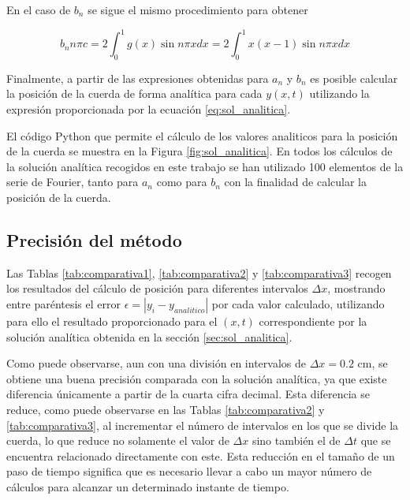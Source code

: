 \documentclass[11pt]{article}
\begin{document}
En el caso de $b_n$ se sigue el mismo procedimiento para obtener

\begin{equation}
	b_n n\pi{c} = 2 \int_0^1 g(x) \sin{n\pi{x}}dx = 2 \int_0^1 x(x-1) \sin{n\pi{x}}dx 
\end{equation}

Finalmente, a partir de las expresiones obtenidas para $a_n$ y $b_n$ es posible calcular
la posición de la cuerda de forma analítica para cada $y(x,t)$ utilizando la expresión
proporcionada por la ecuación \eqref{eq:sol_analitica}.

El código Python que permite el cálculo de los valores analiticos para la posición de la
cuerda se muestra en la Figura \ref{fig:sol_analitica}. En todos los cálculos de la solución
analítica recogidos en este trabajo se han utilizado 100 elementos de la serie de Fourier,
tanto para $a_n$ como para $b_n$ con la finalidad de calcular la posición de la cuerda.

\subsection{Precisión del método}

Las Tablas \ref{tab:comparativa1}, \ref{tab:comparativa2} y \ref{tab:comparativa3} recogen
los resultados del cálculo de posición para diferentes intervalos $\Delta{x}$, mostrando
entre paréntesis el error $\epsilon = |y_i - y_{analitico}|$ por cada valor calculado,
utilizando para ello el resultado proporcionado para el $(x,t)$ correspondiente por la
solución analítica obtenida en la sección \ref{sec:sol_analitica}.

Como puede observarse, aun con una división en intervalos de $\Delta{x} = 0.2$ cm, se 
obtiene una buena precisión comparada con la solución analítica, ya que existe diferencia
únicamente a partir de la cuarta cifra decimal. Esta diferencia se reduce, como puede
observarse en las Tablas \ref{tab:comparativa2} y \ref{tab:comparativa3}, al incrementar
el número de intervalos en los que se divide la cuerda, lo que reduce no solamente el
valor de $\Delta{x}$ sino también el de $\Delta{t}$ que se encuentra relacionado
directamente con este. Esta reducción en el tamaño de un paso de tiempo significa que es
necesario llevar a cabo un mayor número de cálculos para alcanzar un determinado instante
de tiempo.
\end{document}
